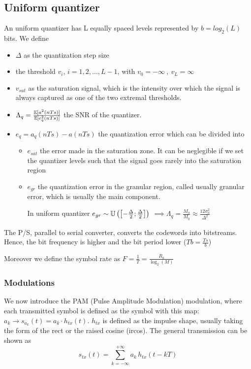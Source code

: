 \subsection{Uniform quantizer}
An uniform quantizer has L equally spaced levels represented by $b = log_2(L)$ bits. We define
\begin{itemize}
  \item $\Delta$ as the quantization step size
  \item the threshold $v_i$, $i = 1, 2, \dots, L - 1$, with $v_0 = -\infty \ ,\ v_L = \infty$
  \item $v_{sat}$ as the saturation signal, which is the intensity over which the signal is always captured as one of the two extremal thresholds.
  \item $\Lambda_q = \frac{\mathbb{E}[a^2(nTs)]}{\mathbb{E}[e_q^2(nTs)]}$ the SNR of the quantizer.
  \item $e_q = a_q(n Ts) - a(n Ts)$ the quantization error which can be divided into
  \begin{itemize}
    \item $e_{sat}$ the error made in the saturation zone. It can be neglegible if we set the quantizer levels such that the signal goes rarely into the saturation region
    \item $e_{gr}$ the quantization error in the granular region, called usually granular error, which is usually the main component.

    In uniform quantizer $e_{gr}\sim \mathbb{U}\left(\left[-\frac{\Delta}{2};\frac{\Delta}{2}\right]\right)$
    $\implies \Lambda_q = \frac{M_a}{M_q} \approx \frac{12 \sigma_a^2 }{\Delta^2}$
  \end{itemize}
\end{itemize}

The P/S, parallel to serial converter, converts the codewords into bitstreams. Hence, the bit frequency is higher and the bit period lower ($Tb = \frac{Ts}{b}$)

Moreover we define the symbol rate as $F=\frac{1}{T} = \frac{R_b}{\log_2(M)}$

%   
\subsubsection{Modulations}
We now introduce the PAM (Pulse Amplitude Modulation) modulation, where each transmitted symbol is defined as the symbol with this map: $a_k \to s_{a_k} (t) = a_k \cdot h_{tx}(t)$. $h_{tx}$ is defined as the impulse shape, usually taking the form of the rect or the raised cosine (ircos).
The general transmission can be shown as
\begin{equation}
  s_{tx}(t) = \sum\limits_{k=-\infty}^{+\infty} a_k \, h_{tx}(t - kT)
\end{equation}

